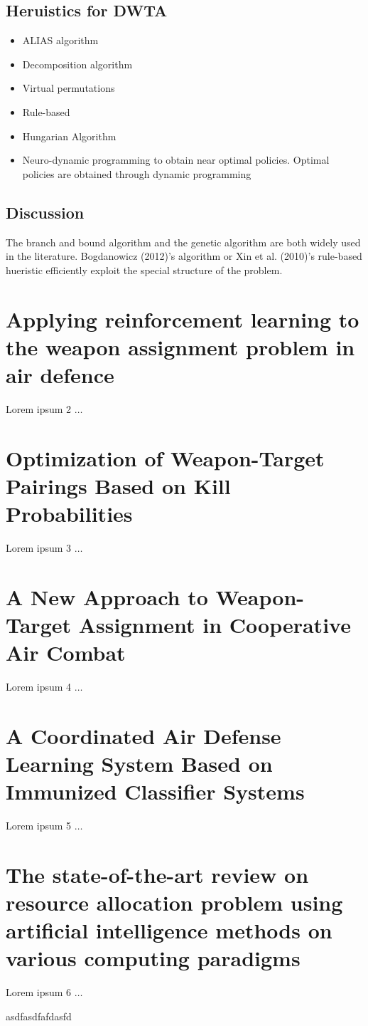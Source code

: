 \documentclass[12pt]{article} %
\begin{document}
\subsection*{Heruistics for DWTA}

\begin{itemize}
    \item ALIAS algorithm 
    \item Decomposition algorithm 
    \item Virtual permutations
    \item Rule-based
    \item Hungarian Algorithm
    \item Neuro-dynamic programming to obtain near optimal policies. Optimal policies are obtained through dynamic programming
\end{itemize}

\subsection*{Discussion}
The branch and bound algorithm and the genetic algorithm are both widely used in the literature. Bogdanowicz (2012)'s algorithm or 
Xin et al. (2010)'s rule-based hueristic efficiently exploit the special structure of the problem.


\section*{Applying reinforcement learning to the weapon assignment problem in air defence \cite{rl_wa_airDefence_mouton_2011}}
Lorem ipsum 2 $\ldots$


\section*{Optimization of Weapon-Target Pairings Based on Kill Probabilities \cite{killProbs_bogdanowicz_2013}}
Lorem ipsum 3 $\ldots$


\section*{A New Approach to Weapon-Target Assignment in Cooperative Air Combat \cite{swarmHarmony_chang_2017}}
Lorem ipsum 4 $\ldots$


\section*{A Coordinated Air Defense Learning System Based on Immunized Classifier Systems \cite{immunized_nantogma_2021}}
Lorem ipsum 5 $\ldots$


\section*{The state-of-the-art review on resource allocation problem using artificial intelligence methods on various computing paradigms \cite{resourceAlloc_joloudari_2022}}
Lorem ipsum 6 $\ldots$






asdfasdfafdasfd
\end{document}
